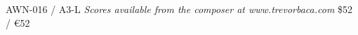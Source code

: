 \documentclass[11pt]{report}
\begin{document}
\null \vfill

AWN-016 / A3-L \hfill
\textit{Scores available from the composer at www.trevorbaca.com}
\hfill \$52 / \euro 52
\end{document}
